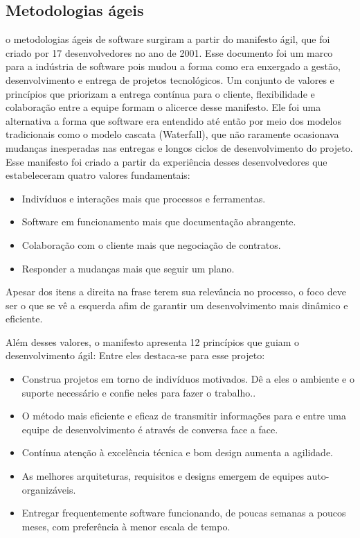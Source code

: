 \subsection{Metodologias ágeis}
o metodologias ágeis de software surgiram a partir do manifesto ágil, que foi criado por 17 desenvolvedores no ano de 2001. Esse documento foi um marco para a indústria de software pois mudou a forma como era enxergado a gestão, desenvolvimento e entrega de projetos tecnológicos. 
Um conjunto de valores e princípios que priorizam a entrega contínua para o cliente, flexibilidade e colaboração entre a equipe formam o alicerce desse manifesto. Ele foi uma alternativa a forma que software era entendido até então por meio dos modelos tradicionais como o modelo cascata (Waterfall), que não raramente ocasionava mudanças inesperadas nas entregas e longos ciclos de desenvolvimento do projeto. Esse manifesto foi criado a partir da experiência desses desenvolvedores que estabeleceram quatro valores fundamentais: 

\begin{itemize}
    \item Indivíduos e interações mais que processos e ferramentas.
    \item Software em funcionamento mais que documentação abrangente.
    \item Colaboração com o cliente mais que negociação de contratos.
    \item Responder a mudanças mais que seguir um plano.
\end{itemize}

Apesar dos itens a direita na frase terem sua relevância no processo, o foco deve ser o que se vê a esquerda afim de garantir um desenvolvimento mais dinâmico e eficiente.

Além desses valores, o manifesto apresenta 12 princípios que guiam o desenvolvimento ágil: Entre eles destaca-se para esse projeto:

\begin{itemize}
    \item Construa projetos em torno de indivíduos motivados. Dê a eles o ambiente e o suporte necessário e confie neles para fazer o trabalho..
    \item O método mais eficiente e eficaz de transmitir informações para e entre uma equipe de desenvolvimento é através de conversa face a face.
    \item Contínua atenção à excelência técnica e bom design aumenta a agilidade.
    \item As melhores arquiteturas, requisitos e designs emergem de equipes auto-organizáveis.
    \item Entregar frequentemente software funcionando, de poucas semanas a poucos meses, com preferência à menor escala de tempo.
\end{itemize}

